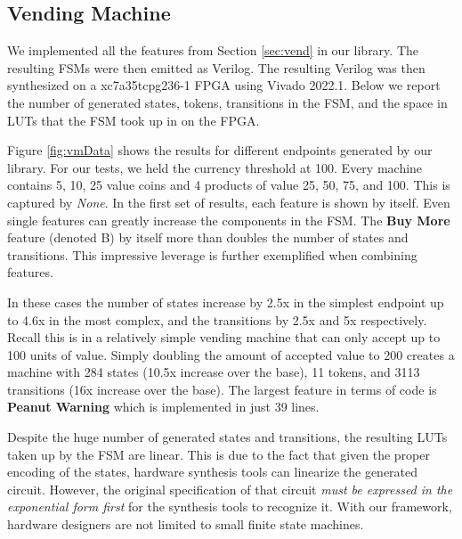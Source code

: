\documentclass[sigplan,anonymous,review]{acmart}
\begin{document}
\subsection{Vending Machine}
We implemented all the features from Section \ref{sec:vend} in our library. The resulting FSMs were then emitted as Verilog. The resulting Verilog was then synthesized on a xc7a35tcpg236-1 FPGA using Vivado 2022.1. Below we report the number of generated states, tokens, transitions in the FSM, and the space in LUTs that the FSM took up in on the FPGA. 

Figure \ref{fig:vmData} shows the results for different endpoints generated by our library. For our tests, we held the currency threshold at 100. Every machine contains 5, 10, 25 value coins and 4 products of value 25, 50, 75, and 100. This is captured by \textit{None}. In the first set of results, each feature is shown by itself. Even single features can greatly increase the components in the FSM. The \textbf{Buy More} feature (denoted B) by itself more than doubles the number of states and transitions. This impressive leverage is further exemplified when combining features. 

In these cases the number of states increase by 2.5x in the simplest endpoint up to 4.6x in the most complex, and the transitions by 2.5x and 5x respectively. Recall this is in a relatively simple vending machine that can only accept up to 100 units of value. Simply doubling the amount of accepted value to 200 creates a machine with 284 states (10.5x increase over the base), 11 tokens, and 3113 transitions (16x increase over the base). The largest feature in terms of code is \textbf{Peanut Warning} which is implemented in just 39 lines.

Despite the huge number of generated states and transitions, the resulting LUTs taken up by the FSM are linear. This is due to the fact that given the proper encoding of the states, hardware synthesis tools can linearize the generated circuit. However, the original specification of that circuit \textit{must be expressed in the exponential form first} for the synthesis tools to recognize it. With our framework, hardware designers are not limited to small finite state machines. 
\end{document}
